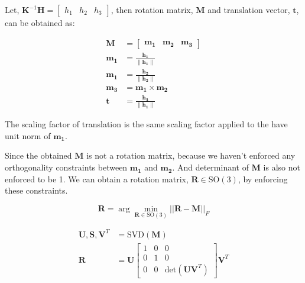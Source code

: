 \documentclass{article}
\begin{document}
Let, $\mathbf{K}^{-1} \mathbf{H} = \begin{bmatrix} h_1 & h_2 & h_3\end{bmatrix}$, then rotation matrix, $\mathbf{M}$ and translation vector, $\mathbf{t}$, can be obtained as:


\begin{align}
    \mathbf{M} &= \begin{bmatrix} \mathbf{m_1} & \mathbf{m_2} & \mathbf{m_3} \end{bmatrix} \\
    \mathbf{m_1} &= \frac{\mathbf{h_1}}{\|\mathbf{h_1}\|}  \\
    \mathbf{m_1} &= \frac{\mathbf{h_2}}{\|\mathbf{h_2}\|} \\
    \mathbf{m_3} &= \mathbf{m_1} \times \mathbf{m_2} \\
    \mathbf{t} &= \frac{\mathbf{h_3}}{\|\mathbf{h_1}\|}
\end{align}

The scaling factor of translation is the same scaling factor applied to the have unit norm of $\mathbf{m_1}$. 

Since the obtained $\mathbf{M}$ is not a rotation matrix, because we haven't enforced any orthogonality constraints between $\mathbf{m_1}$ and $\mathbf{m_2}$. 
And determinant of $\mathbf{M}$ is also not enforced to be 1. We can obtain a rotation matrix, $\mathbf{R} \in \mathrm{SO}(3)
$, by enforcing these constraints.



\begin{equation}
    \mathbf{R} = \arg\min_{\mathbf{R} \in \mathrm{SO}(3)} ||\mathbf{R} - \mathbf{M}||_F
\end{equation}
    
\begin{align}
    \mathbf{U}, \mathbf{S}, \mathbf{V}^T &= \mathrm{SVD}(\mathbf{M}) \\
    \mathbf{R} &= \mathbf{U} \begin{bmatrix} 1 & 0 & 0 \\ 0 & 1 & 0 \\ 0 & 0 & \mathrm{det}(\mathbf{U} \mathbf{V}^T) \end{bmatrix} \mathbf{V}^T
\end{align}
\end{document}
